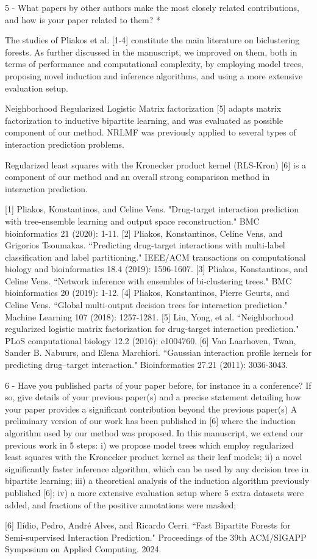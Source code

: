 \documentclass[sn-mathphys-num]{sn-jnl}
\begin{document}
5 - What papers by other authors make the most closely related contributions, and how is your paper related to them? * 

The studies of Pliakos et al. [1-4] constitute the main literature on biclustering forests. As further discussed in the manuscript, we improved on them, both in terms of performance and computational complexity, by employing model trees, proposing novel induction and inference algorithms, and using a more extensive evaluation setup.

Neighborhood Regularized Logistic Matrix factorization [5] adapts matrix factorization to inductive bipartite learning, and was evaluated as possible component of our method. NRLMF was previously applied to several types of interaction prediction problems.

Regularized least squares with the Kronecker product kernel (RLS-Kron) [6] is a component of our method and an overall strong comparison method in interaction prediction.

[1] Pliakos, Konstantinos, and Celine Vens. "Drug-target interaction prediction with tree-ensemble learning and output space reconstruction." BMC bioinformatics 21 (2020): 1-11.
[2] Pliakos, Konstantinos, Celine Vens, and Grigorios Tsoumakas. ``Predicting drug-target interactions with multi-label classification and label partitioning." IEEE/ACM transactions on computational biology and bioinformatics 18.4 (2019): 1596-1607.
[3] Pliakos, Konstantinos, and Celine Vens. ``Network inference with ensembles of bi-clustering trees." BMC bioinformatics 20 (2019): 1-12.
[4] Pliakos, Konstantinos, Pierre Geurts, and Celine Vens. ``Global multi-output decision trees for interaction prediction." Machine Learning 107 (2018): 1257-1281.
[5] Liu, Yong, et al. ``Neighborhood regularized logistic matrix factorization for drug-target interaction prediction." PLoS computational biology 12.2 (2016): e1004760.
[6] Van Laarhoven, Twan, Sander B. Nabuurs, and Elena Marchiori. ``Gaussian interaction profile kernels for predicting drug–target interaction." Bioinformatics 27.21 (2011): 3036-3043.

6 - Have you published parts of your paper before, for instance in a conference? If so, give details of your previous paper(s) and a precise statement detailing how your paper provides a significant contribution beyond the previous paper(s)
A preliminary version of our work has been published in [6] where the induction algorithm used by our method was proposed. In this manuscript, we extend our previous work in 5 steps: i) we propose model trees which employ regularized least squares with the Kronecker product kernel as their leaf models; ii) a novel significantly faster inference algorithm, which can be used by any decision tree in bipartite learning; iii) a theoretical analysis of the induction algorithm previously published [6]; iv) a more extensive evaluation setup where 5 extra datasets were added, and fractions of the positive annotations were masked;

[6] Ilídio, Pedro, André Alves, and Ricardo Cerri. ``Fast Bipartite Forests for Semi-supervised Interaction Prediction." Proceedings of the 39th ACM/SIGAPP Symposium on Applied Computing. 2024.
\end{document}
